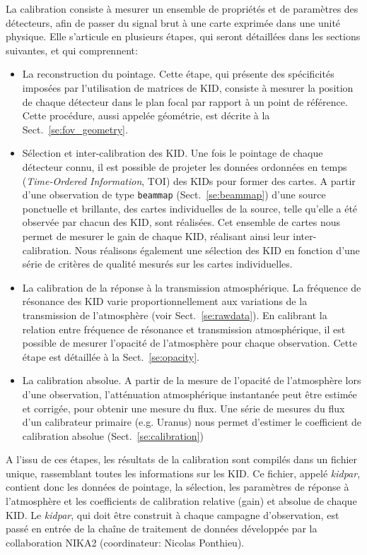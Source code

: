 La calibration consiste à mesurer un ensemble de propriétés et de
paramètres des détecteurs, afin de passer du signal brut à une carte
exprimée dans une unité physique. Elle s'articule en plusieurs étapes, qui
seront détaillées dans les sections suivantes, et qui comprennent:
\begin{itemize}
  \item{La reconstruction du pointage. Cette étape, qui présente
    des spécificités imposées par l'utilisation de matrices de KID,
    consiste à mesurer la position de chaque détecteur dans le plan
    focal par rapport à un point de référence. Cette procédure, aussi
    appelée géométrie, est décrite à la Sect.~\ref{se:fov_geometry}.}
  \item{Sélection et inter-calibration des KID. Une fois le pointage
    de chaque détecteur connu, il est possible de projeter les données
    ordonnées en temps (\emph{Time-Ordered Information}, TOI)} des KIDs
    pour former des cartes. A partir d'une observation de type
    {\tt beammap} (Sect.~\ref{se:beammap}) d'une source ponctuelle
    et brillante, des cartes individuelles de la source, telle qu'elle
    a été observée par chacun des KID, sont réalisées. Cet ensemble
    de cartes nous permet de mesurer le gain de chaque KID, réalisant
    ainsi leur inter-calibration. Nous réalisons également une
    sélection des KID en fonction d'une série de critères de qualité
    mesurés sur les cartes individuelles.
  \item{La calibration de la réponse à la transmission
    atmosphérique. La fréquence de résonance des KID varie
    proportionnellement aux variations de la transmission de
    l'atmosphère (voir Sect.~\ref{se:rawdata}). En calibrant la
    relation entre
    fréquence de résonance et transmission atmosphérique, il est
    possible de mesurer l'opacité de l'atmosphère pour chaque
    observation. Cette étape est détaillée à la
    Sect.~\ref{se:opacity}.}
  \item{La calibration absolue. A partir de la mesure de l'opacité de
    l'atmosphère lors d'une observation, l'atténuation atmosphérique
    instantanée peut être estimée et corrigée, pour obtenir une mesure
    du flux. Une série de mesures du flux d'un calibrateur primaire
    (e.g. Uranus) nous permet d'estimer le coefficient de calibration
    absolue (Sect.~\ref{se:calibration})}
\end{itemize}

A l'issu de ces étapes, les résultats de la calibration sont compilés
dans un fichier unique, rassemblant toutes les informations sur les
KID. Ce fichier, appelé \emph{kidpar}, contient donc les données de
pointage, la sélection, les paramètres de réponse à l'atmosphère et
les coefficients de calibration relative (gain) et absolue de chaque
KID. Le \emph{kidpar}, qui doit être construit à chaque campagne
d'observation, est passé en entrée de la chaîne de traitement de
données développée par la collaboration NIKA2 (coordinateur: Nicolas
Ponthieu).

